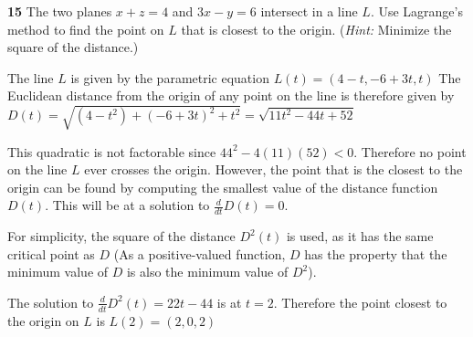 \documentclass{article}
\begin{document}
\noindent \textbf{15} The two planes $x + z = 4$ and $3x - y = 6$ intersect in a 
line $L$. Use Lagrange's method to find the point on $L$ that is closest to the 
origin. (\textit{Hint:} Minimize the square of the distance.)

The line $L$ is given by the parametric equation
$L(t) = (4 - t, -6 + 3t, t)$
The Euclidean distance from the origin of any point on the line is therefore given by 
$D(t) = \sqrt{ (4 - t^2) + (-6 + 3t)^2 + t^2 } = \sqrt{11t^2 - 44t + 52}$

This quadratic is not factorable since $44^2 - 4(11)(52) < 0$. Therefore no point on 
the line $L$ ever crosses the origin. However, the point that is the closest to the 
origin can be found by 
computing the smallest value of the distance function $D(t)$. This will be at a 
solution to  
$\frac{d}{d t}D(t) = 0$. 

For simplicity, the square of the distance $D^2(t)$ is used, as it has the same 
critical point as $D$ (As a positive-valued function, $D$ has the property that 
the minimum value of $D$ is also the minimum value of $D^2$). 

The solution to $\frac{d}{dt}D^2(t) = 22t - 44$ is at $t = 2$. 
Therefore the point closest to the origin on $L$ is $L(2) = (2, 0, 2)$
\end{document}
